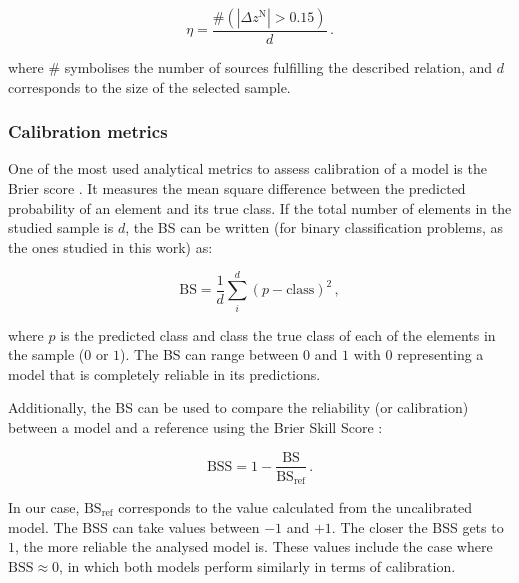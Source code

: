 \documentclass{aa}
\begin{document}
\begin{equation}\label{eq:outlier_fraction}
\eta = \frac{\# \left( \left|\Delta z^{\mathrm{N}}\right| > 0.15 \right)}{d}\,.
\end{equation}

\noindent where $\#$ symbolises the number of sources fulfilling the described relation, and $d$ corresponds to the size of the selected sample.


\subsubsection{Calibration metrics}\label{sec:metrics_calibration}

One of the most used analytical metrics to assess calibration of a model is the Brier score \citep[BS;][]{Brier_1950}. It measures the mean square difference between the predicted probability of an element and its true class. If the total number of elements in the studied sample is $d$, the BS can be written (for binary classification problems, as the ones studied in this work) as:

\begin{equation}\label{eq:brier_score}
\mathrm{BS} = \frac{1}{d} \sum_{i}^{d}(p - \mathrm{class})^{2}\,,
\end{equation}

\noindent where $p$ is the predicted class and \textrm{class} the true class of each of the elements in the sample ($0$ or $1$).
The BS can range between $0$ and $1$ with $0$ representing a model that is completely reliable in its predictions.

Additionally, the BS can be used to compare the reliability (or calibration) between a model and a reference using the Brier Skill Score \citep[BSS; e.g.][]{Glahn_1970}:

\begin{equation}\label{eq:brier_skill_score}
\mathrm{BSS} = 1 - \frac{\mathrm{BS}}{\mathrm{BS}_{\mathrm{ref}}}\,.
\end{equation}

In our case, $\mathrm{BS}_{\mathrm{ref}}$ corresponds to the value calculated from the uncalibrated model. The BSS can take values between $-1$ and $+1$. The closer the BSS gets to $1$, the more reliable the analysed model is. These values include the case where ${\mathrm{BSS} {\approx} 0}$, in which both models perform similarly in terms of calibration.
\end{document}
